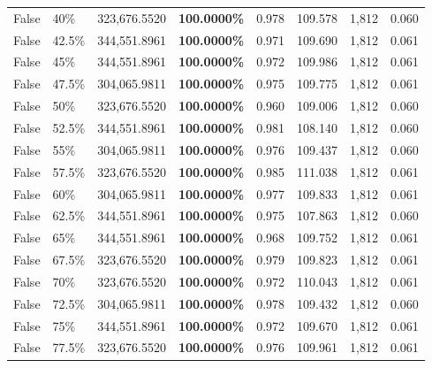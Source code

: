 \begin{table}[H]
\begin{tabular}{lllrllll}
\cline{1-8} \cline{2-8}
False & 40\% & 323,676.5520 & \bfseries \color{red} 100.0000\% & 0.978 & 109.578 & 1,812 & 0.060 \\
\cline{1-8} \cline{2-8}
False & 42.5\% & 344,551.8961 & \bfseries \color{red} 100.0000\% & 0.971 & 109.690 & 1,812 & 0.061 \\
\cline{1-8} \cline{2-8}
False & 45\% & 344,551.8961 & \bfseries \color{red} 100.0000\% & 0.972 & 109.986 & 1,812 & 0.061 \\
\cline{1-8} \cline{2-8}
False & 47.5\% & \color{red} 304,065.9811 & \bfseries \color{red} 100.0000\% & 0.975 & 109.775 & 1,812 & 0.061 \\
\cline{1-8} \cline{2-8}
False & 50\% & 323,676.5520 & \bfseries \color{red} 100.0000\% & 0.960 & 109.006 & 1,812 & 0.060 \\
\cline{1-8} \cline{2-8}
False & 52.5\% & 344,551.8961 & \bfseries \color{red} 100.0000\% & 0.981 & 108.140 & 1,812 & 0.060 \\
\cline{1-8} \cline{2-8}
False & 55\% & \color{red} 304,065.9811 & \bfseries \color{red} 100.0000\% & 0.976 & 109.437 & 1,812 & 0.060 \\
\cline{1-8} \cline{2-8}
False & 57.5\% & 323,676.5520 & \bfseries \color{red} 100.0000\% & 0.985 & 111.038 & 1,812 & 0.061 \\
\cline{1-8} \cline{2-8}
False & 60\% & \color{red} 304,065.9811 & \bfseries \color{red} 100.0000\% & 0.977 & 109.833 & 1,812 & 0.061 \\
\cline{1-8} \cline{2-8}
False & 62.5\% & 344,551.8961 & \bfseries \color{red} 100.0000\% & 0.975 & 107.863 & 1,812 & 0.060 \\
\cline{1-8} \cline{2-8}
False & 65\% & 344,551.8961 & \bfseries \color{red} 100.0000\% & 0.968 & 109.752 & 1,812 & 0.061 \\
\cline{1-8} \cline{2-8}
False & 67.5\% & 323,676.5520 & \bfseries \color{red} 100.0000\% & 0.979 & 109.823 & 1,812 & 0.061 \\
\cline{1-8} \cline{2-8}
False & 70\% & 323,676.5520 & \bfseries \color{red} 100.0000\% & 0.972 & 110.043 & 1,812 & 0.061 \\
\cline{1-8} \cline{2-8}
False & 72.5\% & \color{red} 304,065.9811 & \bfseries \color{red} 100.0000\% & 0.978 & 109.432 & 1,812 & 0.060 \\
\cline{1-8} \cline{2-8}
False & 75\% & 344,551.8961 & \bfseries \color{red} 100.0000\% & 0.972 & 109.670 & 1,812 & 0.061 \\
\cline{1-8} \cline{2-8}
False & 77.5\% & 323,676.5520 & \bfseries \color{red} 100.0000\% & 0.976 & 109.961 & 1,812 & 0.061 \\

\end{tabular}
\end{table}
